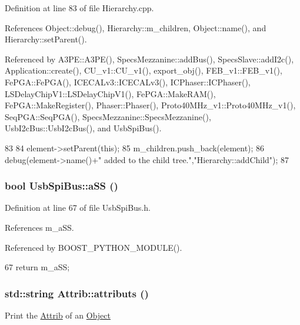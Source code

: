 Definition at line 83 of file Hierarchy.cpp.

References Object::debug(), Hierarchy::m\_\-children, Object::name(), and Hierarchy::setParent().

Referenced by A3PE::A3PE(), SpecsMezzanine::addBus(), SpecsSlave::addI2c(), Application::create(), CU\_\-v1::CU\_\-v1(), export\_\-obj(), FEB\_\-v1::FEB\_\-v1(), FePGA::FePGA(), ICECALv3::ICECALv3(), ICPhaser::ICPhaser(), LSDelayChipV1::LSDelayChipV1(), FePGA::MakeRAM(), FePGA::MakeRegister(), Phaser::Phaser(), Proto40MHz\_\-v1::Proto40MHz\_\-v1(), SeqPGA::SeqPGA(), SpecsMezzanine::SpecsMezzanine(), UsbI2cBus::UsbI2cBus(), and UsbSpiBus().


\begin{DoxyCode}
83                                           {
84   element->setParent(this);
85   m_children.push_back(element);
86   debug(element->name()+" added to the child tree.","Hierarchy::addChild");
87 }
\end{DoxyCode}
\hypertarget{classUsbSpiBus_afd9b0823f348dddc7fed8ae97d248e9c}{
\subsubsection[{aSS}]{\setlength{\rightskip}{0pt plus 5cm}bool UsbSpiBus::aSS ()}}
\label{classUsbSpiBus_afd9b0823f348dddc7fed8ae97d248e9c}


Definition at line 67 of file UsbSpiBus.h.

References m\_\-aSS.

Referenced by BOOST\_\-PYTHON\_\-MODULE().


\begin{DoxyCode}
67 { return m_aSS; }
\end{DoxyCode}
\hypertarget{classAttrib_aee7bbf16b144887f196e1341b24f8a26}{
\subsubsection[{attributs}]{\setlength{\rightskip}{0pt plus 5cm}std::string Attrib::attributs ()}}
\label{classAttrib_aee7bbf16b144887f196e1341b24f8a26}
Print the \hyperlink{classAttrib}{Attrib} of an \hyperlink{classObject}{Object} 


